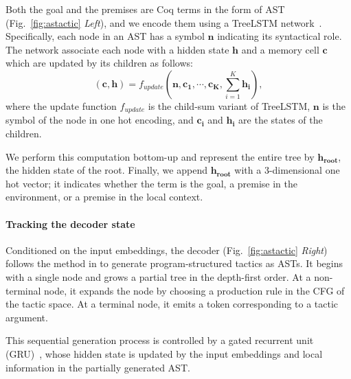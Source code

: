 \documentclass{article}
\newcommand{\smallsec}[1]{\vspace{-3mm} \paragraph{#1}}
\begin{document}
Both the goal and the premises are Coq terms in the form of AST (Fig.~\ref{fig:astactic} \textit{Left}), and we encode them using a TreeLSTM network~\citep{tai2015improved}. 
Specifically, each node in an AST has a symbol $\mathbf{n}$ indicating its syntactical role.
The network associate each node with a hidden state $\mathbf{h}$ and a memory cell $\mathbf{c}$ which are updated by its children as follows:
\[
(\mathbf{c}, \mathbf{h}) = f_{update}(\mathbf{n}, \mathbf{c_1}, \cdots, \mathbf{c_K}, \sum_{i=1}^{K}{\mathbf{h_i}}),
\]
where the update function $f_{update}$ is the child-sum variant of TreeLSTM, $\mathbf{n}$ is the symbol of the node in one hot encoding, and $\mathbf{c_i}$ and $\mathbf{h_i}$ are the states of the children.

We perform this computation bottom-up and represent the entire tree by $\mathbf{h_{root}}$, the hidden state of the root.
Finally, we append $\mathbf{h_{root}}$ with a 3-dimensional one hot vector;
it indicates whether the term is the goal, a premise in the environment, or a premise in the local context.


\smallsec{Tracking the decoder state}
Conditioned on the input embeddings, the decoder (Fig.~\ref{fig:astactic} \textit{Right}) follows the method in \citet{yin2017syntactic} to generate program-structured tactics as ASTs.
It begins with a single node and grows a partial tree in the depth-first order. At a non-terminal node, it expands the node by choosing a production rule in the CFG of the tactic space. At a terminal node, it emits a token corresponding to a tactic argument.

This sequential generation process is controlled by a gated recurrent unit (GRU)~\cite{cho2014learning}, whose hidden state is updated by the input embeddings and local information in the partially generated AST. 
\end{document}
